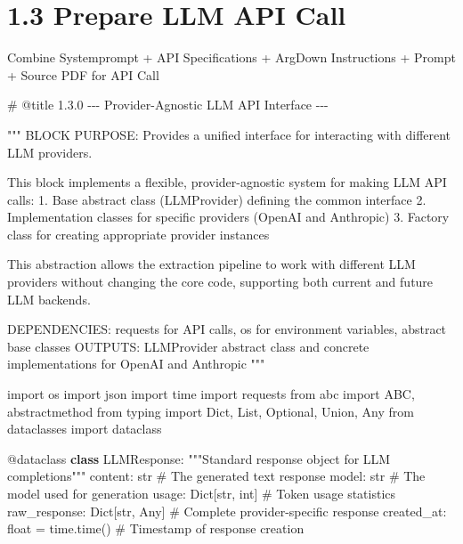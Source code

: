 \documentclass[
  11pt,
  letterpaper,
]{book}
\newenvironment{Shaded}{\begin{snugshade}}{\end{snugshade}}
\newcommand{\AttributeTok}[1]{\textcolor[rgb]{0.40,0.45,0.13}{#1}}
\newcommand{\BuiltInTok}[1]{\textcolor[rgb]{0.00,0.23,0.31}{#1}}
\newcommand{\CommentTok}[1]{\textcolor[rgb]{0.37,0.37,0.37}{#1}}
\newcommand{\ImportTok}[1]{\textcolor[rgb]{0.00,0.46,0.62}{#1}}
\newcommand{\KeywordTok}[1]{\textcolor[rgb]{0.00,0.23,0.31}{\textbf{#1}}}
\newcommand{\NormalTok}[1]{\textcolor[rgb]{0.00,0.23,0.31}{#1}}
\newcommand{\OperatorTok}[1]{\textcolor[rgb]{0.37,0.37,0.37}{#1}}
\begin{document}
\section{1.3 Prepare LLM API Call}\label{prepare-llm-api-call}

Combine Systemprompt + API Specifications + ArgDown Instructions +
Prompt + Source PDF for API Call

\begin{Shaded}
\begin{Highlighting}[]
\CommentTok{\# @title 1.3.0 {-}{-}{-} Provider{-}Agnostic LLM API Interface {-}{-}{-}}

\CommentTok{"""}
\CommentTok{BLOCK PURPOSE: Provides a unified interface for interacting with different LLM providers.}

\CommentTok{This block implements a flexible, provider{-}agnostic system for making LLM API calls:}
\CommentTok{1. Base abstract class (LLMProvider) defining the common interface}
\CommentTok{2. Implementation classes for specific providers (OpenAI and Anthropic)}
\CommentTok{3. Factory class for creating appropriate provider instances}

\CommentTok{This abstraction allows the extraction pipeline to work with different LLM providers}
\CommentTok{without changing the core code, supporting both current and future LLM backends.}

\CommentTok{DEPENDENCIES: requests for API calls, os for environment variables, abstract base classes}
\CommentTok{OUTPUTS: LLMProvider abstract class and concrete implementations for OpenAI and Anthropic}
\CommentTok{"""}

\ImportTok{import}\NormalTok{ os}
\ImportTok{import}\NormalTok{ json}
\ImportTok{import}\NormalTok{ time}
\ImportTok{import}\NormalTok{ requests}
\ImportTok{from}\NormalTok{ abc }\ImportTok{import}\NormalTok{ ABC, abstractmethod}
\ImportTok{from}\NormalTok{ typing }\ImportTok{import}\NormalTok{ Dict, List, Optional, Union, Any}
\ImportTok{from}\NormalTok{ dataclasses }\ImportTok{import}\NormalTok{ dataclass}

\AttributeTok{@dataclass}
\KeywordTok{class}\NormalTok{ LLMResponse:}
    \CommentTok{"""Standard response object for LLM completions"""}
\NormalTok{    content: }\BuiltInTok{str}            \CommentTok{\# The generated text response}
\NormalTok{    model: }\BuiltInTok{str}              \CommentTok{\# The model used for generation}
\NormalTok{    usage: Dict[}\BuiltInTok{str}\NormalTok{, }\BuiltInTok{int}\NormalTok{]   }\CommentTok{\# Token usage statistics}
\NormalTok{    raw\_response: Dict[}\BuiltInTok{str}\NormalTok{, Any]  }\CommentTok{\# Complete provider{-}specific response}
\NormalTok{    created\_at: }\BuiltInTok{float} \OperatorTok{=}\NormalTok{ time.time()  }\CommentTok{\# Timestamp of response creation}


\end{Highlighting}
\end{Shaded}
\end{document}
